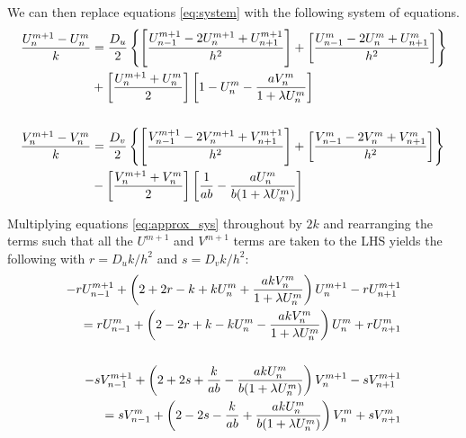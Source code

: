 We can then replace equations \eqref{eq:system} with the following system of
equations.
\begin{subequations} \label{eq:approx_sys}
\begin{align}
    \frac{U_{n}^{m+1} - U_{n}^{m}}{k} &=
        \frac{D_u}{2} \left\{
           \left[ \frac{U_{n-1}^{m+1}-2U_{n}^{m+1}+U_{n+1}^{m+1}}{h^2} \right] +
            \left[ \frac{U_{n-1}^{m}-2U_{n}^{m}+U_{n+1}^{m}}{h^2} \right]
        \right\} \notag\\
        &+ \left[ \frac{U_n^{m+1} + U_n^m}{2} \right]
           \left[ 1 - U_n^m - \frac{a V_n^m}{1 + \lambda U_n^m} \right]
           \label{eq:approx_prey}
        \\ \notag
        \\
    \frac{V_{n}^{m+1} - V_{n}^{m}}{k} &=
        \frac{D_v}{2} \left\{
           \left[ \frac{V_{n-1}^{m+1}-2V_{n}^{m+1}+V_{n+1}^{m+1}}{h^2} \right] +
           \left[ \frac{V_{n-1}^{m}-2V_{n}^{m}+V_{n+1}^{m}}{h^2} \right]
        \right\} \notag\\
        &- \left[ \frac{V_n^{m+1} + V_n^m}{2} \right]
           \left[ \frac{1}{ab} - \frac{a U_n^m}{b ( 1 + \lambda U_n^m )} \right]
           \label{eq:approx_pred}
\end{align}
\end{subequations}

Multiplying equations \eqref{eq:approx_sys} throughout by $2k$ and rearranging
the terms such that all the $U^{m+1}$ and $V^{m+1}$ terms are taken to the LHS
yields the following with $r = D_u k / h^2$ and $s = D_v k / h^2$:
\begin{subequations} \label{eq:rearranged_approx_sys}
\begin{align}
    -r U_{n-1}^{m+1} +
    \left(
        2 + 2r - k + k U_n^m + \frac{a k V_n^m}{1 + \lambda U_n^m}
    \right)
    U_n^{m+1} - r U_{n+1}^{m+1} \notag
    \\
    = r U_{n-1}^m +
    \left(
        2 - 2r + k - k U_n^m - \frac{a k V_n^m}{1 + \lambda U_n^m}
    \right)
    U_n^m + r U_{n+1}^m
    \\
    \notag
    \\
    -s V_{n-1}^{m+1} +
    \left(
        2 + 2s + \frac{k}{ab} - \frac{a k U_n^m}{b ( 1 + \lambda U_n^m )}
    \right)
    V_n^{m+1} - s V_{n+1}^{m+1} \notag
    \\
    = s V_{n-1}^m +
    \left(
        2 - 2s - \frac{k}{ab} + \frac{a k U_n^m}{b ( 1 + \lambda U_n^m )}
    \right)
    V_n^m + s V_{n+1}^m
\end{align}
\end{subequations}

